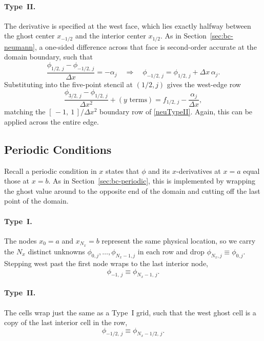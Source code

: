 \paragraph{Type~II.}
The derivative is specified at the west face, which lies exactly halfway
between the ghost center $x_{-1/2}$ and the interior center $x_{1/2}$. As in
Section~\ref{sec:bc-neumann}, a one-sided difference across that face is
second-order accurate at the domain boundary, such that
\begin{equation}
    \frac{\phi_{1/2,\,j}-\phi_{-1/2,\,j}}{\Delta x} = -\alpha_j
    \quad\Longrightarrow\quad
    \phi_{-1/2,\,j} = \phi_{1/2,\,j} + \Delta x\,\alpha_j.
    \label{eq:2Dneu-typeII-ghost}
\end{equation}
Substituting into the five-point stencil at $(1/2,j)$ gives the west-edge row
\begin{equation}
    \frac{\phi_{3/2,\,j}-\phi_{1/2,\,j}}{\Delta x^2}
    + (\text{$y$ terms})
    = f_{1/2,\,j} - \frac{\alpha_j}{\Delta x},
    \label{eq:2Dneu-typeII}
\end{equation}
matching the $[\,-1,\ 1\,]/\Delta x^2$ boundary row of \eqref{neuTypeII}. Again, this can be applied across the entire edge.



\subsection{Periodic Conditions}
\label{sec:2Dperiodic}

Recall a periodic condition in $x$ states that $\phi$ and its
$x$-derivatives at $x=a$ equal those at $x=b$. As in Section~\ref{sec:bc-periodic},
this is implemented by wrapping the ghost value around to the opposite end of the domain and cutting off the last point of the domain.

\paragraph{Type~I.}
The nodes $x_0=a$ and $x_{N_x}=b$ represent the same physical location, so we
carry the $N_x$ distinct unknowns $\phi_{0,j},\dots,\phi_{N_x-1,j}$ in each
row and drop $\phi_{N_x,j}\equiv\phi_{0,j}$. Stepping west past the first node
wraps to the last interior node,
\begin{equation}
    \phi_{-1,\,j}\equiv\phi_{N_x-1,\,j}.
    \label{eq:2Dper-typeI}
\end{equation}


\paragraph{Type~II.}
The cells wrap just the same as a Type~I grid, such that the west ghost cell is a copy of the last interior
cell in the row,
\begin{equation}
    \phi_{-1/2,\,j}\equiv\phi_{N_x-1/2,\,j}.
\end{equation}
 



